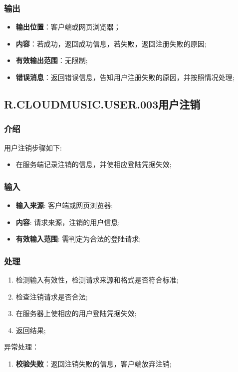 \subsubsection{输出}
\begin{itemize}
	\item \textbf{输出位置}：客户端或网页浏览器；
	\item \textbf{内容}：若成功，返回成功信息，若失败，返回注册失败的原因;
	\item \textbf{有效输出范围}：无限制;
	\item \textbf{错误消息}：返回错误信息，告知用户注册失败的原因，并按照情况处理;
\end{itemize}

\subsection{R.CLOUDMUSIC.USER.003用户注销}
\subsubsection{介绍}
用户注销步骤如下:
	\begin{itemize}
		\item 在服务端记录注销的信息，并使相应登陆凭据失效;
	\end{itemize}
\subsubsection{输入}
	\begin{itemize}
		\item \textbf{输入来源}: 客户端或网页浏览器;
		\item \textbf{内容}: 请求来源，注销的用户信息;
		\item \textbf{有效输入范围}: 需判定为合法的登陆请求;
	\end{itemize}
\subsubsection{处理}
	\begin{enumerate}
		\item 检测输入有效性，检测请求来源和格式是否符合标准;
		\item 检查注销请求是否合法;
		\item 在服务器上使相应的用户登陆凭据失效;
		\item 返回结果;
	\end{enumerate}
	\noindent 异常处理：
	\begin{enumerate}
		\item \textbf{校验失败}：返回注销失败的信息，客户端放弃注销;
	\end{enumerate}
